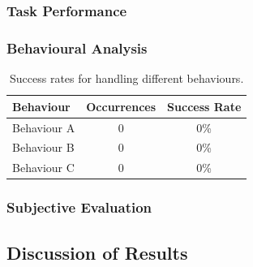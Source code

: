 \documentclass[11pt]{article}
\newif\ifguidance
\newcommand{\guidance}[1]{\ifguidance\textcolor{blue}{\small\textit{[#1]}}\fi}
\begin{document}
\begin{multicols}{2}
\guidance{%
  Describe your extrinsic evaluation plan: participant recruitment,
  study procedure, ethical approval, and any measures taken to ensure
  data quality (e.g.\ attention checks, exclusion criteria).}

\subsubsection{Task Performance}

\guidance{%
  Report objective task-level results: task success rate, number of
  turns, slot-filling accuracy, dialogue efficiency, etc.}


\subsubsection{Behavioural Analysis}

\guidance{%
  If applicable, analyse how the system handled specific user behaviours
  (e.g.\ pauses, self-corrections, interruptions). Present in a table.}

\begin{table}[H]
\centering
\small
\begin{tabular}{lcc}
\toprule
\textbf{Behaviour} & \textbf{Occurrences} & \textbf{Success Rate} \\
\midrule
Behaviour A & 0 & 0\% \\
Behaviour B & 0 & 0\% \\
Behaviour C & 0 & 0\% \\
\bottomrule
\end{tabular}
\caption{Success rates for handling different behaviours.}
\label{tab:behaviour_results}
\end{table}

\subsubsection{Subjective Evaluation}

\guidance{%
  Report questionnaire results. Describe the instrument (e.g.\
  Godspeed, Likert scales), validity checks (KMO, Cronbach's alpha),
  and statistical tests used. Present frequencies and averages with
  figures if possible.}


\subsection{Discussion of Results}


\end{multicols}
\end{document}
